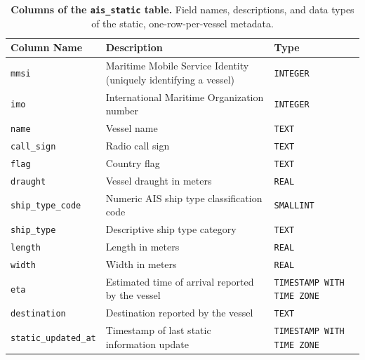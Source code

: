 \documentclass[10pt,a4paper]{article}
\begin{document}
\begin{table}[ht]
\caption{\textbf{Columns of the \texttt{ais\_static} table.} Field names, descriptions, and data types of the static, one-row-per-vessel metadata.}
\label{tab:ais-static-variables}
\vspace{0.2cm}
\centering
\small
\begin{tabular}{@{}p{}p{}p{}@{}}
\toprule
{\bfseries Column Name} & {\bfseries Description} & {\bfseries Type} \\
\midrule
\texttt{mmsi} & Maritime Mobile Service Identity (uniquely identifying a vessel) & \texttt{INTEGER} \\
\texttt{imo} & International Maritime Organization number & \texttt{INTEGER} \\
\texttt{name} & Vessel name & \texttt{TEXT} \\
\texttt{call\_sign} & Radio call sign & \texttt{TEXT} \\
\texttt{flag} & Country flag & \texttt{TEXT} \\
\texttt{draught} & Vessel draught in meters & \texttt{REAL} \\
\texttt{ship\_type\_code} & Numeric AIS ship type classification code & \texttt{SMALLINT} \\
\texttt{ship\_type} & Descriptive ship type category & \texttt{TEXT} \\
\texttt{length} & Length in meters & \texttt{REAL} \\
\texttt{width} & Width in meters & \texttt{REAL} \\
\texttt{eta} & Estimated time of arrival reported by the vessel & \texttt{TIMESTAMP WITH TIME ZONE} \\
\texttt{destination} & Destination reported by the vessel & \texttt{TEXT} \\
\texttt{static\_updated\_at} & Timestamp of last static information update & \texttt{TIMESTAMP WITH TIME ZONE} \\
\bottomrule
\end{tabular}
\end{table}
\end{document}
